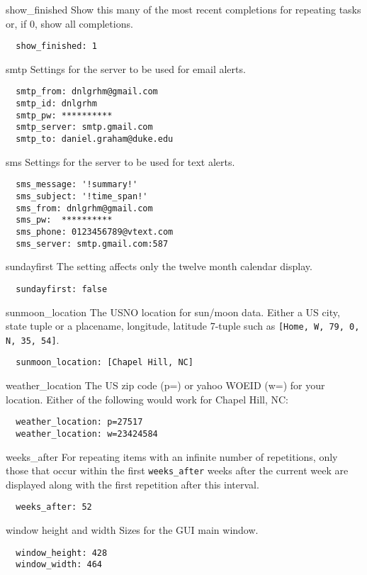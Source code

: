 \documentclass[10pt,landscape]{article}
\begin{document}
\begin{multicols}{3}
\begin{compactdesc}
\item[show\_finished] Show this many of the most recent completions for repeating tasks or, if 0, show all completions.
\begin{verbatim}
  show_finished: 1
\end{verbatim}

\item[smtp] Settings for the server to be used for email alerts.
\begin{verbatim}
  smtp_from: dnlgrhm@gmail.com
  smtp_id: dnlgrhm
  smtp_pw: **********
  smtp_server: smtp.gmail.com
  smtp_to: daniel.graham@duke.edu
\end{verbatim}

\item[sms] Settings for the server to be used for text alerts.
\begin{verbatim}
  sms_message: '!summary!'
  sms_subject: '!time_span!'
  sms_from: dnlgrhm@gmail.com
  sms_pw:  **********
  sms_phone: 0123456789@vtext.com
  sms_server: smtp.gmail.com:587
\end{verbatim}

\item[sundayfirst] The setting affects only the twelve month calendar display.
\begin{verbatim}
  sundayfirst: false
\end{verbatim}

\item[sunmoon\_location] The USNO location for sun/moon data. Either a US city, state tuple or a placename, longitude, latitude 7-tuple such as \verb![Home, W, 79, 0, N, 35, 54]!.
\begin{verbatim}
  sunmoon_location: [Chapel Hill, NC]
\end{verbatim}

\item[weather\_location] The US zip code (p=) or yahoo WOEID (w=) for your location. Either of the following would work for Chapel Hill, NC:
\begin{verbatim}
  weather_location: p=27517
  weather_location: w=23424584
\end{verbatim}

\item[weeks\_after] For repeating items with an infinite number of repetitions, only those that occur within the first \verb'weeks_after' weeks after the current week are displayed along with the first repetition after this interval.
\begin{verbatim}
  weeks_after: 52
\end{verbatim}

\item[window height and width] Sizes for the GUI main window.
\begin{verbatim}
  window_height: 428
  window_width: 464
\end{verbatim}

\end{compactdesc}

\end{multicols}
\end{document}
